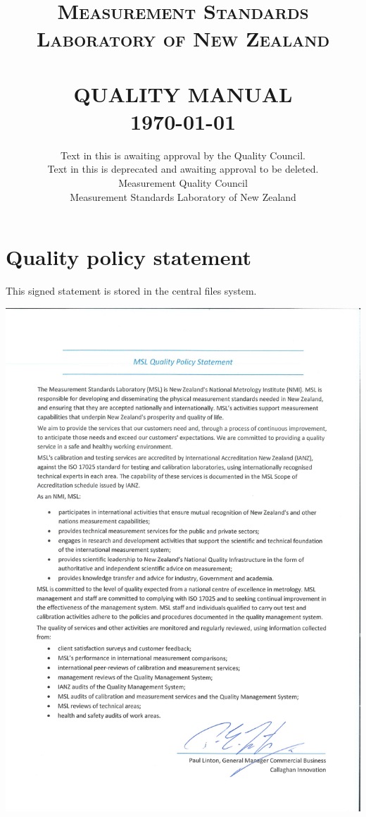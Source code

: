 \documentclass[a4paper]{article}
\title{	\Large 
	\textsc{ Measurement Standards Laboratory of New Zealand } \\ [2.0cm]			
	\HRule{2pt} \\ [0.25cm]						
	\LARGE \textbf{\uppercase{Quality Manual}}	%
	\HRule{2pt} \\ [0.25cm]		
	\Large \today			
}
\author{
{\large 
	Text in this \proposed{colour} is awaiting approval by the 
	Quality Council.\\ 
	Text in this \deprecated{colour} is deprecated 
	and awaiting approval to be deleted.
} 
\\[\baselineskip] 		
Measurement Quality Council\\	
Measurement Standards Laboratory of New Zealand\\	
}
\makeatletter
\def\printtitle{%
    {\centering \@title\par}}
\def\printauthor{%
    {\raggedright \Large \@author}}
\makeatother
\begin{document}
\hypersetup{pageanchor=false}	%
\fancyhf{}	%

\thispagestyle{empty}		%
\pagestyle{plain}			%

\printtitle					%
  	\vfill
\printauthor				%
\newpage


\tableofcontents
\newpage

\section*{Quality policy statement}
\label{ss:quality_policy_statement}
This signed statement is stored in the central files system. 

\begin{center}
\includegraphics[width=1.05\textwidth]{pictures/MSL_qps_(signed)}
\end{center}
\clearpage
\end{document}

